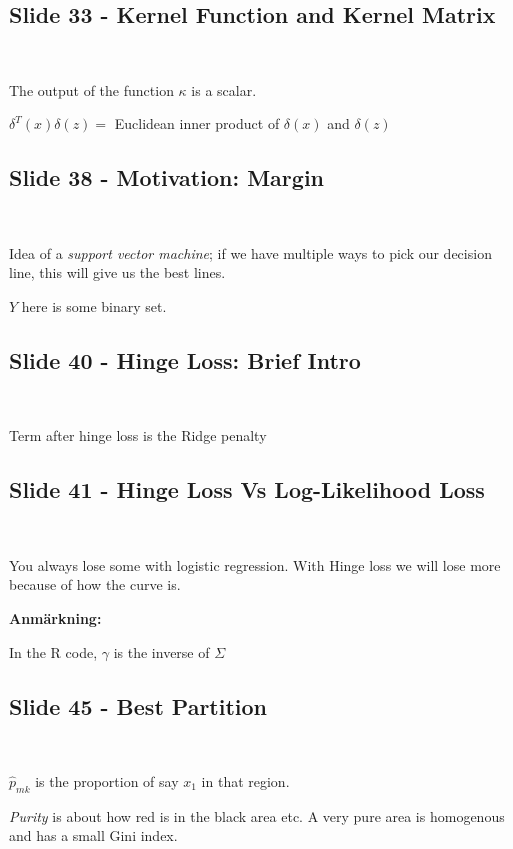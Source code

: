\subsection{Slide 33 - Kernel Function and Kernel Matrix}\hfill\\\par
\noindent The output of the function $\kappa$  is a scalar.
\par\bigskip
\noindent $\delta^T(x)\delta(z) = $ Euclidean inner product of $\delta(x)$ and $\delta(z)$
\par\bigskip
\subsection{Slide 38 - Motivation: Margin}\hfill\\\par
\noindent Idea of a \textit{support vector machine}; if we have multiple ways to pick our decision line, this will give us the best lines.
\par\bigskip
\noindent $Y $ here is some binary set.
\par\bigskip
\subsection{Slide 40 - Hinge Loss: Brief Intro}\hfill\\\par
\noindent Term after hinge loss is the Ridge penalty
\par\bigskip
\subsection{Slide 41 - Hinge Loss Vs Log-Likelihood Loss}\hfill\\\par
\noindent You always lose some with logistic regression. With Hinge loss we will lose more because of how the curve is. 
\par\bigskip
\noindent\textbf{Anmärkning:}\par
\noindent In the R code, $\gamma$ is the inverse of $\Sigma$
\par\bigskip
\subsection{Slide 45 - Best Partition}\hfill\\\par
\noindent $\widehat{p}_{mk}$ is the proportion of say $x_1$ in that region.
\par\bigskip
\noindent\textit{Purity} is about how red is in the black area etc. A very pure area is homogenous and has a small Gini index.
\par\bigskip

